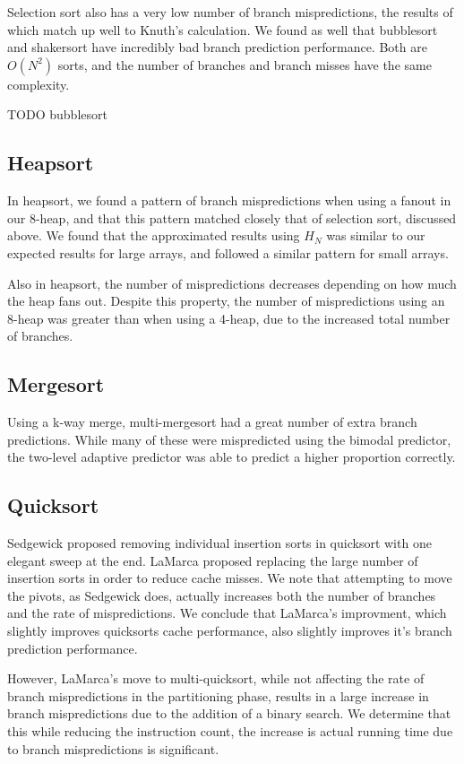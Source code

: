 Selection sort also has a very low number of branch mispredictions, the results
of which match up well to Knuth's calculation. We found as well that bubblesort
and shakersort have incredibly bad branch prediction performance. Both are
$O(N^2)$ sorts, and the number of branches and branch misses have the same
complexity.

TODO bubblesort

\subsection{Heapsort}
In heapsort, we found a pattern of branch mispredictions when using a fanout in
our 8-heap, and that this pattern matched closely that of selection sort,
discussed above. We found that the approximated results using $H_N$ was similar to
our expected results for large arrays, and followed a similar pattern for small
arrays.

Also in heapsort, the number of mispredictions decreases depending on how much
the heap fans out.  Despite this property, the number of mispredictions using an
8-heap was greater than when using a 4-heap, due to the increased total number
of branches.

\subsection{Mergesort}

Using a k-way merge, multi-mergesort had a great number of extra branch
predictions. While many of these were mispredicted using the bimodal predictor,
the two-level adaptive predictor was able to predict a higher
proportion correctly.

\subsection{Quicksort}

Sedgewick proposed removing individual insertion sorts in quicksort with one
elegant sweep at the end. LaMarca proposed replacing the large number of
insertion sorts in order to reduce cache misses. We note that attempting to move
the pivots, as Sedgewick does, actually increases both the number of branches
and the rate of mispredictions. We conclude that LaMarca's improvment, which
slightly improves quicksorts cache performance, also slightly improves it's
branch prediction performance.

However, LaMarca's move to multi-quicksort, while not affecting the rate of
branch mispredictions in the partitioning phase, results in a large increase in
branch mispredictions due to the addition of a binary search. We determine that
this while reducing the instruction count, the increase is actual running time
due to branch mispredictions is significant.

